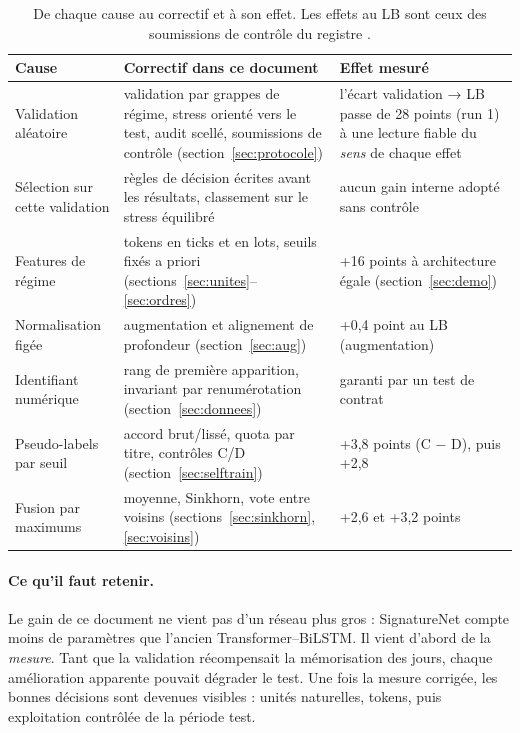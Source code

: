 \begin{table}[H]\centering\small
\begin{tabularx}{\linewidth}{>{\raggedright\arraybackslash}p{3.3cm}>{\raggedright\arraybackslash}X>{\raggedright\arraybackslash}p{3.6cm}}
\toprule
Cause & Correctif dans ce document & Effet mesuré\\
\midrule
Validation aléatoire & validation par grappes de régime, stress orienté vers le test, audit scellé, soumissions de contrôle (section~\ref{sec:protocole}) & l'écart validation → LB passe de 28 points (run 1) à une lecture fiable du \emph{sens} de chaque effet\\
Sélection sur cette validation & règles de décision écrites avant les résultats, classement sur le stress équilibré & aucun gain interne adopté sans contrôle\\
Features de régime & tokens en ticks et en lots, seuils fixés a priori (sections~\ref{sec:unites}--\ref{sec:ordres}) & +16 points à architecture égale (section~\ref{sec:demo})\\
Normalisation figée & augmentation et alignement de profondeur (section~\ref{sec:aug}) & +0,4 point au LB (augmentation)\\
Identifiant numérique & rang de première apparition, invariant par renumérotation (section~\ref{sec:donnees}) & garanti par un test de contrat\\
Pseudo-labels par seuil & accord brut/lissé, quota par titre, contrôles C/D (section~\ref{sec:selftrain}) & +3,8 points (C − D), puis +2,8\\
Fusion par maximums & moyenne, Sinkhorn, vote entre voisins (sections~\ref{sec:sinkhorn}, \ref{sec:voisins}) & +2,6 et +3,2 points\\
\bottomrule
\end{tabularx}
\caption{De chaque cause au correctif et à son effet. Les effets au LB sont ceux des soumissions de contrôle du registre .}
\label{tab:diagnostic}
\end{table}

\paragraph{Ce qu'il faut retenir.} Le gain de ce document ne vient pas d'un réseau plus gros : SignatureNet compte moins de paramètres que l'ancien Transformer--BiLSTM. Il vient d'abord de la \emph{mesure}. Tant que la validation récompensait la mémorisation des jours, chaque amélioration apparente pouvait dégrader le test. Une fois la mesure corrigée, les bonnes décisions sont devenues visibles : unités naturelles, tokens, puis exploitation contrôlée de la période test.
